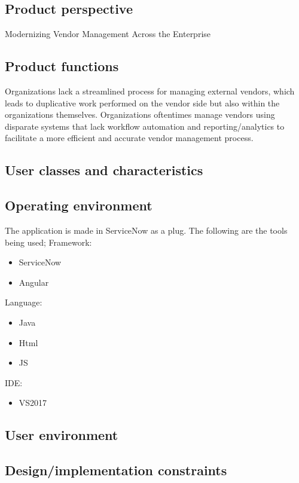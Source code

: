 \documentclass[10pt]{article}
\begin{document}
\subsection{Product perspective}

Modernizing Vendor Management Across the Enterprise

\subsection{Product functions}

Organizations lack a streamlined process for managing external vendors, which leads to duplicative work performed on the vendor side but also within the organizations themselves. Organizations oftentimes manage vendors using disparate systems that lack workflow automation and reporting/analytics to facilitate a more efficient and accurate vendor management process.

\subsection{User classes and characteristics}

\lipsum[10]

\subsection{Operating environment}

The application is made in ServiceNow as a plug. The following are the tools being used;
Framework:
\begin{itemize}
	\item ServiceNow
	\item Angular
\end{itemize}
Language:
\begin{itemize}
	\item Java
	\item Html
	\item JS
\end{itemize}
IDE:
\begin{itemize}
	\item VS2017
\end{itemize}

\subsection{User environment}

\lipsum[10]

\subsection{Design/implementation constraints}
\end{document}
